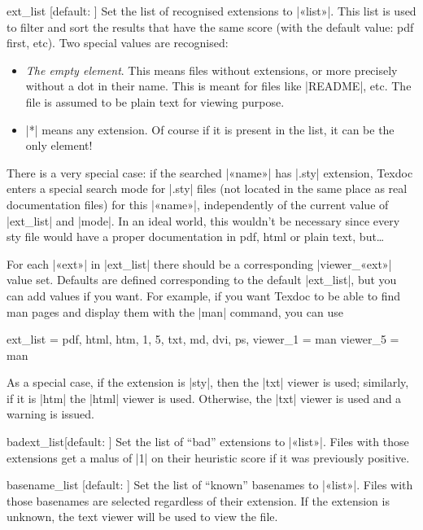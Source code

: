 \documentclass{texdoc-doc}
\begin{document}
\begin{confitem}{ext\_list}
  {}[default: ]
Set the list of recognised extensions to |«list»|. This list is used to filter
and  sort the results that have the same score (with the default value: pdf
first, etc). Two special values are recognised:
%
\begin{itemize}
\item \emph{The empty element}. This means files without extensions, or more
  precisely without a dot in their name. This is meant for files like
  |README|, etc. The file is assumed to be plain text for viewing purpose.
\item |*| means any extension. Of course if it is present in the list, it
  can be the only element!
\end{itemize}

There is a very special case: if the searched |«name»| has |.sty| extension,
Texdoc enters a special search mode for |.sty| files (not located in the same
place as real documentation files) for this |«name»|, independently of the
current value of |ext_list| and |mode|. In an ideal world, this wouldn't be
necessary since every sty file would have a proper documentation in pdf, html
or plain text, but\dots

For each |«ext»| in |ext_list| there should be a corresponding |viewer_«ext»|
value set. Defaults are defined corresponding to the default |ext_list|, but
you can add values if you want. For example, if you want Texdoc to be able
to find man pages and display them with the |man| command, you can use
%
\begin{htcode}
ext_list = pdf, html, htm, 1, 5, txt, md, dvi, ps,
viewer_1 = man
viewer_5 = man
\end{htcode}

As a special case, if the extension is |sty|, then the |txt| viewer is used;
similarly, if it is |htm| the |html| viewer is used. Otherwise, the |txt|
viewer is used and a warning is issued.
\end{confitem}

\begin{confitem}{badext\_list}{}[default: ]
Set the list of ``bad'' extensions to |«list»|. Files with those extensions get
a malus of |1| on their heuristic score if it was previously positive.
\end{confitem}

\begin{confitem}{basename\_list}
  {}[default: ]
Set the list of ``known'' basenames to |«list»|. Files with those basenames
are selected regardless of their extension. If the extension is unknown, the
text viewer will be used to view the file.
\end{confitem}
\end{document}
